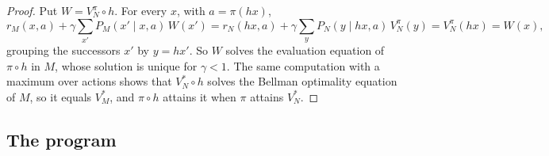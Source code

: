 \documentclass[11pt]{article}
\theoremstyle{definition}
\theoremstyle{plain}
\begin{document}
\begin{proof}
Put $W=V_N^\pi\circ h$. For every $x$, with $a=\pi(hx)$,
\[
r_M(x,a)+\gamma\sum_{x'}P_M(x'\mid x,a)\,W(x')=r_N(hx,a)+\gamma\sum_yP_N(y\mid hx,a)\,V_N^\pi(y)=V_N^\pi(hx)=W(x),
\]
grouping the successors $x'$ by $y=hx'$. So $W$ solves the evaluation equation of $\pi\circ h$ in $M$,
whose solution is unique for $\gamma<1$. The same computation with a maximum over actions shows that
$V_N^*\circ h$ solves the Bellman optimality equation of $M$, so it equals $V_M^*$, and $\pi\circ h$
attains it when $\pi$ attains $V_N^*$.
\end{proof}

\subsection{The program}
\end{document}
